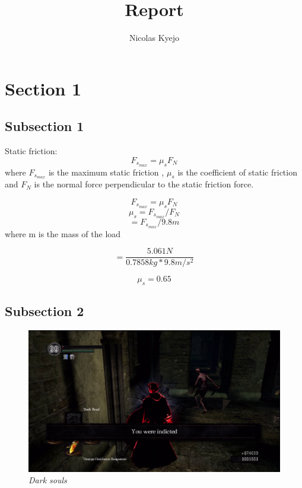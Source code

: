 \documentclass[12pt,a4paper]{article}
\title{\Huge {Report}}
\author{Nicolas Kyejo}
\date{}
\begin{document}
\maketitle
\thispagestyle{empty}      %
\newpage                   %
\tableofcontents
\thispagestyle{empty}      %
\clearpage
\newpage
\listoffigures
\thispagestyle{empty}      %
\clearpage
\newpage
\setcounter{page}{1}        %

\section{Section 1}
\subsection{Subsection 1}
Static friction:
$$
F_{s_{max}} = \mu_s F_N
$$
where $F_{s_{max}}$ is the maximum static friction , $\mu_s$ is the coefficient of static friction and $F_N$ is the normal force perpendicular to the static friction force.

$$F_{s_{max}} = \mu_s F_N$$
$$\mu_s = F_{s_{max}}/F_N$$
$$    = F_{s_{max}}/9.8m $$where m is the mass of the load

$$ =  \frac{5.061 N}{0.7858 kg * 9.8 m/s^2} $$

$$ \mu_s = 0.65 $$

\subsection{Subsection 2}
\begin{figure}[H]
\includegraphics[width=\linewidth]{test}
\caption{\textit{Dark souls}}
\label{Indictment in dark souls} 
\end{figure}
\end{document}
